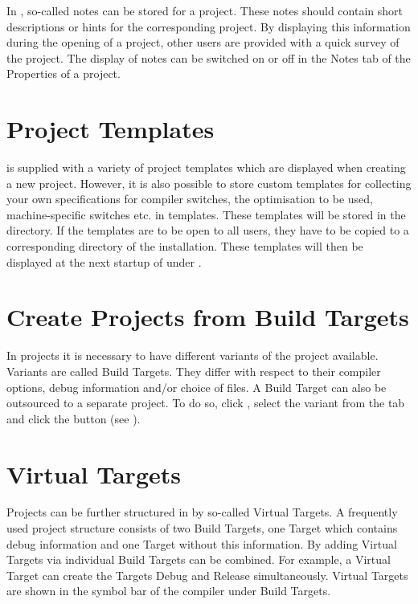 In \codeblocks, so-called notes can be stored for a project. These notes should contain short descriptions or hints for the corresponding project. By displaying this information during the opening of a project, other users are provided with a quick survey of the project. The display of notes can be switched on or off in the Notes tab of the Properties of a project.

\section{Project Templates}

\codeblocks is supplied with a variety of project templates which are displayed when creating a new project. However, it is also possible to store custom templates for collecting your own specifications for compiler switches, the optimisation to be used, machine-specific switches etc. in templates. These templates will be stored in the  directory. If the templates are to be open to all users, they have to be copied to a corresponding directory of the \codeblocks installation. These templates will then be displayed at the next startup of \codeblocks under .


\section{Create Projects from Build Targets}

In projects it is necessary to have different variants of the project available. Variants are called Build Targets. They differ with respect to their compiler options, debug information and/or choice of files. A Build Target can also be outsourced to a separate project. To do so, click , select the variant from the tab  and click the  button (see ).


\section{Virtual Targets}

Projects can be further structured in \codeblocks by so-called Virtual Targets. A frequently used project structure consists of two Build Targets, one  Target which contains debug information and one  Target without this information. By adding Virtual Targets via  individual Build Targets can be combined. For example, a Virtual Target  can create the Targets Debug and Release simultaneously. Virtual Targets are shown in the symbol bar of the compiler under Build Targets.

